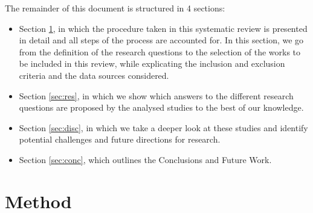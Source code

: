 \documentclass[conference]{IEEEtran}
\begin{document}
The remainder of this document is structured in 4 sections:
\begin{itemize}
	\item Section \ref{sec:meth}, in which the procedure taken in this systematic review is presented in detail and all steps of the process are accounted for. In this section, we go from the definition of the research questions to the selection of the works to be included in this review, while explicating the inclusion and exclusion criteria and the data sources considered.
	\item Section \ref{sec:res}, in which we show which answers to the different research questions are proposed by the analysed studies to the best of our knowledge.
	\item Section \ref{sec:disc}, in which we take a deeper look at these studies and identify potential challenges and future directions for research.
	\item Section \ref{sec:conc}, which outlines the Conclusions and Future Work.
\end{itemize}

\section{Method}
\label{sec:meth}
\end{document}
